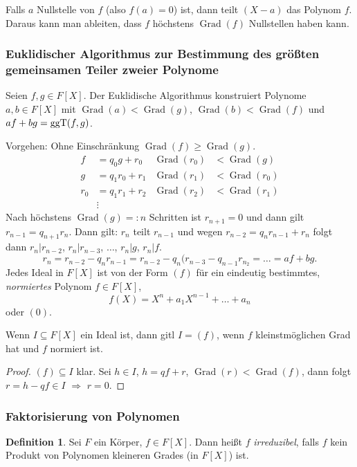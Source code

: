 \documentclass[
 a4paper,
 12pt,
 parskip=half
 ]{scrreprt}
\theoremstyle{plain}
\theoremstyle{definition}
\newtheorem*{defn*}{Definition}
\DeclareMathOperator{\Grad}{Grad}
\numberwithin{equation}{chapter}
\numberwithin{thm}{chapter}
\begin{document}
Falls $a$ Nullstelle von $f$ (also $f(a)=0$) ist, dann teilt $(X-a)$ das Polynom
$f$. Daraus kann man ableiten, dass $f$ höchstens $\Grad(f)$ Nullstellen haben
kann.

\subsubsection{Euklidischer Algorithmus zur Bestimmung des größten gemeinsamen
  Teiler zweier Polynome}
Seien $f, g \in F[X]$. Der Euklidische Algorithmus konstruiert Polynome $a, b
\in F[X]$ mit $\Grad(a) < \Grad(g)$, $\Grad(b) < \Grad(f)$ und $af + bg =
\operatorname{ggT}(f,g)$.

Vorgehen: Ohne Einschränkung $\Grad(f) \ge \Grad(g)$.
\begin{align*}
  f &= q_0 g + r_0 & \Grad(r_0) &< \Grad(g) \\
  g &= q_1 r_0 + r_1 & \Grad(r_1) &< \Grad(r_0) \\
  r_0 &= q_1 r_1 + r_2 & \Grad(r_2) &< \Grad(r_1) \\
  &\vdots
\end{align*}
Nach höchstens $\Grad(g) =: n$ Schritten ist $r_{n+1} = 0$ und dann gilt $r_{n-1}
= q_{n+1} r_n$.
Dann gilt: $r_n$ teilt $r_{n-1}$ und wegen $r_{n-2} = q_n r_{n-1} + r_n$ folgt
dann $r_n | r_{n-2}$, $r_n | r_{n-3}$, $\ldots$, $r_n | g$, $r_n | f$.
\[ r_n = r_{n-2} - q_n r_{n-1} = r_{n-2} - q_n( r_{n-3} - q_{n-1} r_{n_2} =
  \ldots = af + bg. \]
Jedes Ideal in $F[X]$  ist von der Form $(f)$ für ein eindeutig bestimmtes,
\emph{normiertes} Polynom $f \in F[X]$,
\[ f(X) = X^n  + a_1 X^{n-1} + \ldots + a_n \]
oder $(0)$.

Wenn $I \subseteq F[X]$ ein Ideal ist, dann gitl $I = (f)$, wenn $f$
kleinstmöglichen Grad hat und $f$ normiert ist.

\begin{proof} $(f) \subseteq I$ klar. Sei $h \in I$, $h = qf + r$, $\Grad(r) <
  \Grad(f)$, dann folgt $r = h - qf \in I$ $\Rightarrow$ $r = 0$.
\end{proof}

\subsubsection*{Faktorisierung von Polynomen}
\begin{defn*}
  Sei $F$ ein Körper, $f \in F[X]$. Dann heißt $f$ \emph{irreduzibel}, falls $f$
  kein Produkt von Polynomen kleineren Grades (in $F[X]$) ist.
\end{defn*}
\end{document}

